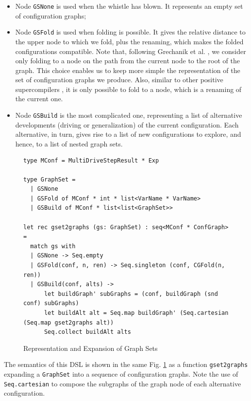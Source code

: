 \documentclass[submission,copyright,creativecommons]{eptcs}
\begin{document}
\begin{itemize}
  \item Node \verb|GSNone| is used when the whistle has blown. 
    It represents an empty set of configuration graphs;
  \item Node \verb|GSFold| is used when folding is possible. 
    It gives the relative distance to the upper node to which we fold, 
    plus the renaming, which makes the folded configurations compatible.
    Note that, following Grechanik et al. \cite{Romanenko2014StagedMRSC}, we consider
    only folding to a node on the path from the current node to the root of the graph.
    This choice enables us to keep more simple the representation of the
    set of configuration graphs we produce.
    Also, similar to other positive supercompilers \cite{Sorensen1994TurchinSupercompiler,sorm98b,TMR/SCP2014},
    it is only possible to fold to a node, which is a renaming of the current one.
  \item Node \verb|GSBuild| is the most complicated one, representing a list
    of alternative developments (driving or generalization) of the current configuration.
    Each alternative, in turn, gives rise to a list of new configurations to explore,
    and hence, to a list of nested graph sets.
\end{itemize}

\begin{figure}
\begin{lstlisting}
type MConf = MultiDriveStepResult * Exp

type GraphSet =
  | GSNone
  | GSFold of MConf * int * list<VarName * VarName>
  | GSBuild of MConf * list<list<GraphSet>>

let rec gset2graphs (gs: GraphSet) : seq<MConf * ConfGraph> =
  match gs with
  | GSNone -> Seq.empty
  | GSFold(conf, n, ren) -> Seq.singleton (conf, CGFold(n, ren)) 
  | GSBuild(conf, alts) ->
      let buildGraph' subGraphs = (conf, buildGraph (snd conf) subGraphs)
      let buildAlt alt = Seq.map buildGraph' (Seq.cartesian (Seq.map gset2graphs alt))
      Seq.collect buildAlt alts
\end{lstlisting}
\caption{Representation and Expansion of Graph Sets}
\label{fig:GraphSet}
\end{figure}

The semantics of this DSL is shown in the same Fig. \ref{fig:GraphSet} as
a function \verb|gset2graphs| expanding a \verb|GraphSet| into a sequence 
of configuration graphs.
Note the use of \verb|Seq.cartesian| to compose the subgraphs of 
the graph node of each alternative configuration.
\end{document}
